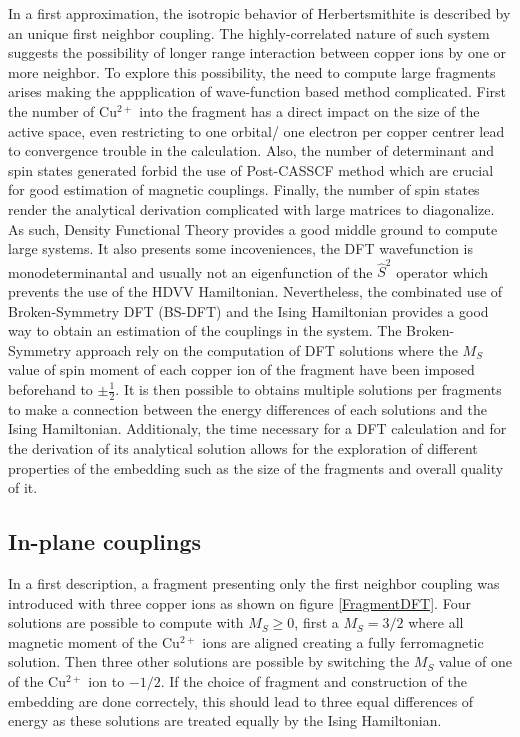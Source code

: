 \documentclass[10pt]{report}
\numberwithin{equation}{section}
\begin{document}
In a first approximation, the isotropic behavior of Herbertsmithite is described by an unique first neighbor coupling. 
The highly-correlated nature of such system suggests the possibility of longer range interaction between copper ions by one or more neighbor. 
To explore this possibility, the need to compute large fragments arises making the appplication of wave-function based method complicated.
First the number of Cu$^{2+}$ into the fragment has a direct impact on the size of the active space, even restricting to one orbital/ one electron per copper centrer lead to convergence trouble in the calculation.
Also, the number of determinant and spin states generated forbid the use of Post-CASSCF method which are crucial for good estimation of magnetic couplings.
Finally, the number of spin states render the analytical derivation complicated with large matrices to diagonalize.
As such, Density Functional Theory provides a good middle ground to compute large systems. 
It also presents some incoveniences, the DFT wavefunction is monodeterminantal and usually not an eigenfunction of the $\hat{S}^2$ operator which prevents the use of the HDVV Hamiltonian.
Nevertheless, the combinated use of Broken-Symmetry DFT (BS-DFT) and the Ising Hamiltonian provides a good way to obtain an estimation of the couplings in the system.
The Broken-Symmetry approach rely on the computation of DFT solutions where the $M_S$ value of spin moment of each copper ion of the fragment have been imposed beforehand to $\pm \frac{1}{2}$. 
It is then possible to obtains multiple solutions per fragments to make a connection between the energy differences of each solutions and the Ising Hamiltonian.
Additionaly, the time necessary for a DFT calculation and for the derivation of its analytical solution allows for the exploration of different properties of the embedding such as the size of the fragments and overall quality of it.


\subsection*{In-plane couplings}

In a first description, a fragment presenting only the first neighbor coupling was introduced with three copper ions as shown on figure \ref{FragmentDFT}.
Four solutions are possible to compute with $M_S$$\ge$$0$, first a $M_S=3/2$ where all magnetic moment of the Cu$^{2+}$ ions are aligned creating a fully ferromagnetic solution. 
Then three other solutions are possible by switching the $M_S$ value of one of the Cu$^{2+}$ ion to $-1/2$. 
If the choice of fragment and construction of the embedding are done correctely, this should lead to three equal differences of energy as these solutions are treated equally by the Ising Hamiltonian.
\end{document}
